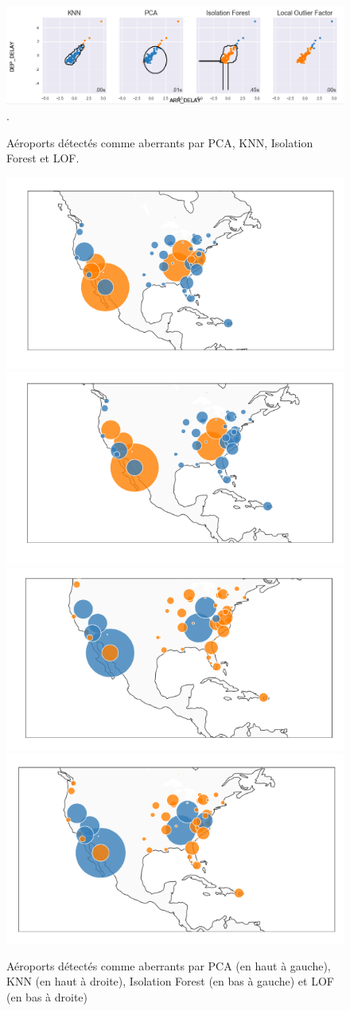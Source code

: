 \begin{figure}[ht]
    \centering
     \includegraphics[width=1\textwidth]{ADOA/Images/Voll.png}\label{fig02}.
    \caption{Aéroports détectés comme aberrants par PCA, KNN, Isolation Forest et LOF.}%
    \includegraphics[width=.45\textwidth]{ADOA/Images/vol1PCA.png}
    \includegraphics[width=.450\textwidth]{ADOA/Images/vols1KNN.png}\\
    \includegraphics[width=.45\textwidth]{ADOA/Images/volsIsoFor.png}
    \includegraphics[width=.450\textwidth]{ADOA/Images/volsLOFpng.png}
    \caption{Aéroports détectés comme aberrants par PCA (en haut à gauche), KNN (en haut à droite), Isolation Forest (en bas à gauche) et LOF (en bas à droite)}%
    \label{fig21}
\end{figure}

